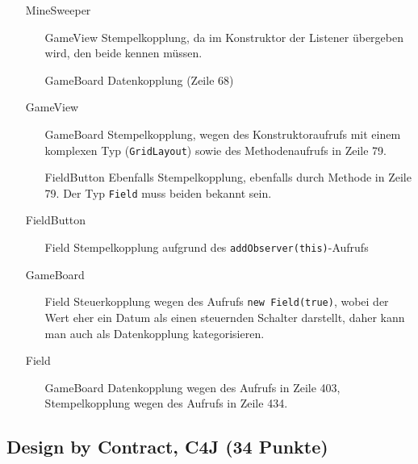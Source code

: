 \documentclass{scrartcl}
\begin{document}
\begin{itemize}[font=\ttfamily,leftmargin=2cm,align=left]
   \item[MineSweeper] ~ %
      \begin{itemize}[font=\ttfamily,align=left]
         \item[GameView] Stempelkopplung, da im Konstruktor der Listener
            übergeben wird, den beide kennen müssen.
         \item[GameBoard] Datenkopplung (Zeile 68)
      \end{itemize}
   \item[GameView] ~
      \begin{itemize}[font=\ttfamily,align=left]
         \item[GameBoard] Stempelkopplung, wegen des
            Konstruktoraufrufs mit einem komplexen Typ (\texttt{GridLayout})
            sowie des Methodenaufrufs in Zeile 79.
         \item[FieldButton] Ebenfalls Stempelkopplung, ebenfalls durch Methode
            in Zeile 79. Der Typ \texttt{Field} muss beiden bekannt sein.
      \end{itemize}
   \item[FieldButton] ~
      \begin{itemize}[font=\ttfamily,align=left]
         \item[Field] Stempelkopplung aufgrund des
            \texttt{addObserver(this)}-Aufrufs
      \end{itemize}
   \item[GameBoard] ~
      \begin{itemize}[font=\ttfamily,align=left]
         \item[Field] Steuerkopplung wegen des Aufrufs \texttt{new Field(true)},
            wobei der Wert eher ein Datum als einen steuernden Schalter
            darstellt, daher kann man auch als Datenkopplung kategorisieren.
      \end{itemize}
   \item[Field] ~
      \begin{itemize}[font=\ttfamily,align=left]
         \item[GameBoard] Datenkopplung wegen des Aufrufs in Zeile 403,
            Stempelkopplung wegen des Aufrufs in Zeile 434.
      \end{itemize}
\end{itemize}
\subsection{Design by Contract, C4J (34 Punkte)}
\end{document}
